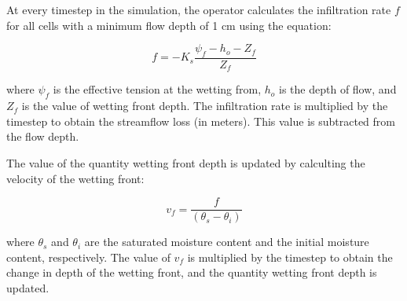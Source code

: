 \documentclass[11pt]{article}
\begin{document}
At every timestep in the simulation, the operator calculates the infiltration rate $f$ for all cells with a minimum flow depth of 1 cm using the equation:

\begin{equation}
f = -K_s \frac{\psi_f - h_o - Z_f}{Z_f}
\end{equation}

\noindent where $\psi_f$ is the effective tension at the wetting from, $h_o$ is the depth of flow, and $Z_f$ is the value of wetting front depth. The infiltration rate is multiplied by the timestep to obtain the streamflow loss (in meters). This value is subtracted from the flow depth.

The value of the quantity wetting front depth is updated by calculting the velocity of the wetting front:

\begin{equation}
v_f = \frac{f}{(\theta_s - \theta_i)}
\end{equation}

\noindent where $\theta_s$ and $\theta_i$ are the saturated moisture content and the initial moisture content, respectively. The value of $v_f$ is multiplied by the timestep to obtain the change in depth of the wetting front, and the quantity wetting front depth is updated.
\end{document}
